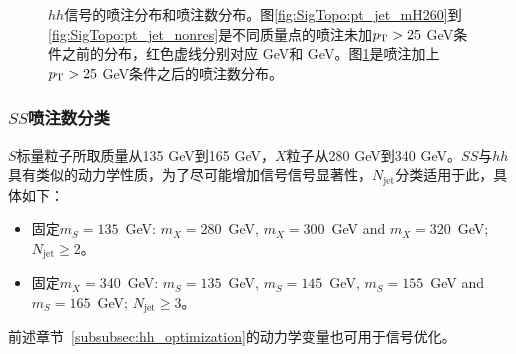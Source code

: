 \begin{figure}
\begin{subfigure}[b]{0.45\textwidth}
 \label{fig:SigTopo:numOfjet_sig}
\end{subfigure}
\caption{$hh$信号的喷注\pt 分布和喷注数分布。图\ref{fig:SigTopo:pt_jet_mH260}到\ref{fig:SigTopo:pt_jet_nonres}是不同质量点的喷注未加$p_{\text{T}}>25$ GeV条件之前的\pt 分布，红色虚线分别对应 GeV和 GeV。图\ref{fig:SigTopo:numOfjet_sig}是喷注加上$p_{\text{T}}>25$ GeV条件之后的喷注数分布。}
\label{fig:SigTopo:pt_jet}
\end{figure}

\subsubsection{$SS$喷注数分类}
$S$标量粒子所取质量从135 GeV到165 GeV，$X$粒子从280 GeV到340 GeV。$SS$与$hh$具有类似的动力学性质，为了尽可能增加信号信号显著性，$N_\text{jet}$分类适用于此，具体如下：
\begin{itemize}
 \item 固定$m_S=135$~GeV: $m_X=280$~GeV, $m_X=300$~GeV and $m_X=320$~GeV; $N_{\text{jet}}\geq$2。
 \item 固定$m_X=340$~GeV: $m_S=135$~GeV, $m_S=145$~GeV, $m_S=155$~GeV and $m_S=165$~GeV; $N_{\text{jet}}\geq$3。
\end{itemize}
前述章节~\ref{subsubsec:hh_optimization}的动力学变量也可用于信号优化。
